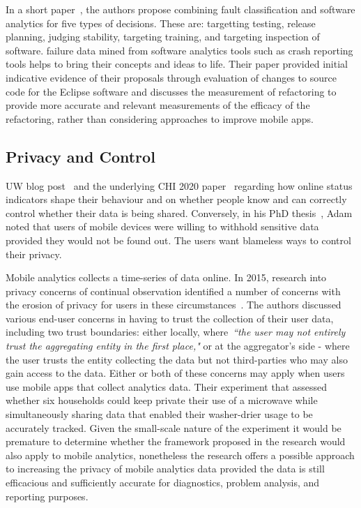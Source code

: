 
In a short paper~\citep{kidwell2015_toward_fault_taxonomy_application_of_software_analytics}, the authors propose combining fault classification and software analytics for five types of decisions. These are: targetting testing, release planning, judging stability, targeting training, and targeting inspection of software. failure data mined from software analytics tools such as crash reporting tools helps to bring their concepts and ideas to life. Their paper provided initial indicative evidence of their proposals through evaluation of changes to source code for the Eclipse software and discusses the measurement of refactoring to provide more accurate and relevant measurements of the efficacy of the refactoring, rather than considering approaches to improve mobile apps.


\subsection{Privacy and Control}

UW blog post~\cite{mcquate_I_saw_you_were_online} and the underlying CHI 2020 paper~\cite{cobb2020_ux_s_with_online_status_indicators} regarding how online status indicators shape their behaviour and on whether people know and can correctly control whether their data is being shared. Conversely, in his PhD thesis~\citep{adam2009balancing}, Adam noted that users of mobile devices were willing to withhold sensitive data provided they would not be found out. The users want blameless ways to control their privacy.

Mobile analytics collects a time-series of data online. In 2015, research into privacy concerns of continual observation identified a number of concerns with the erosion of privacy for users in these circumstances~\citep{erdogdu2015_privacy_utility_tradeoff_under_continual_observation}. The authors discussed various end-user concerns in having to trust the collection of their user data, including two trust boundaries: either locally, where~\emph{``the user may not entirely trust the aggregating entity in the first place,"} or at the aggregator's side - where the user trusts the entity collecting the data but not third-parties who may also gain access to the data. Either or both of these concerns may apply when users use mobile apps that collect analytics data. Their experiment that assessed whether six households could keep private their use of a microwave while simultaneously sharing data that enabled their washer-drier usage to be accurately tracked. Given the small-scale nature of the experiment it would be premature to determine whether the framework proposed in the research would also apply to mobile analytics, nonetheless the research offers a possible approach to increasing the privacy of mobile analytics data provided the data is still efficacious and sufficiently accurate for diagnostics, problem analysis, and reporting purposes.  %

